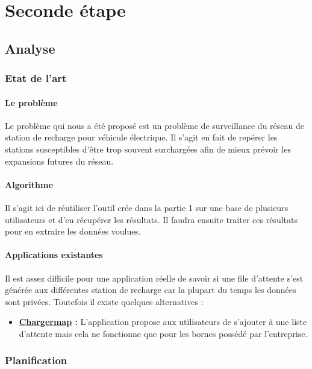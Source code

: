 \documentclass[a4paper, 12pt]{report}
\begin{document}
\chapter{Seconde étape}
\minitoc
{}
\clearpage


\section{Analyse}

\subsection{Etat de l'art}

\subsubsection{Le problème}
Le problème qui nous a été proposé est un problème de surveillance du réseau de station de recharge pour véhicule électrique. Il s'agit en fait de repérer les stations susceptibles d'être trop souvent surchargées afin de mieux prévoir les expansions futures du réseau.

\subsubsection{Algorithme}
Il s'agit ici de réutiliser l'outil crée dans la partie 1 sur une base de plusieurs utilisateurs et d'en récupérer les résultats. Il faudra ensuite traiter ces résultats pour en extraire les données voulues.

\subsubsection{Applications existantes}
Il est assez difficile pour une application réelle de savoir si une file d'attente s'est générée aux différentes station de recharge car la plupart du temps les données sont privées. Toutefois il existe quelques alternatives :

\begin{itemize}
    \item \textbf{\underline{Chargermap} :} L'application propose aux utilisateurs de s'ajouter à une liste d'attente mais cela ne fonctionne que pour les bornes possédé par l'entreprise.
\end{itemize}

\subsection{Planification}
\clearpage
\end{document}
